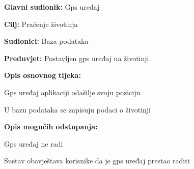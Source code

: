 					\noindent {}
					\begin{packed_item}
						
						\item \textbf{Glavni sudionik:} Gps uređaj
						\item  \textbf{Cilj:} Praćenje životinja
						\item  \textbf{Sudionici:} Baza podataka
						\item  \textbf{Preduvjet:} Postavljen gps uređaj na životinji
						\item  \textbf{Opis osnovnog tijeka:}
						
						\item[] \begin{packed_enum}
							
							\item Gps uređaj aplikaciji odašilje svoju poziciju
							\item U bazu podataka se zapisuju podaci o životinji
							
						\end{packed_enum}
						
						\item  \textbf{Opis mogućih odstupanja:}
						
						\item[] \begin{packed_item}
							
							\item[1.a] Gps uređaj ne radi
							\item[] \begin{packed_enum}
								
								\item Sustav obavještava korisnike da je gps uređaj prestao raditi
								
							\end{packed_enum}
							
						\end{packed_item}
						
					\end{packed_item}
					
